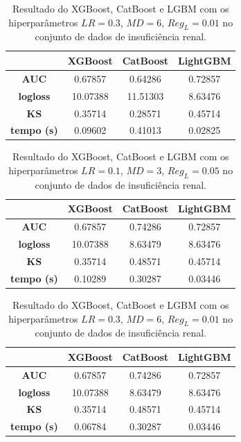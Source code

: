\begin{table}[H]
\label{res:ren:4}
\centering
\begin{tabular}{|c|c|c|c|}
\hline
	& \textbf{XGBoost} &\textbf{CatBoost} & \textbf{LightGBM} \\
\hline
\textbf{AUC}	& 0.67857&	0.64286	&0.72857\\
\hline
\textbf{logloss}	& 10.07388	&11.51303	&8.63476\\
\hline
\textbf{KS}	&0.35714	&0.28571	&0.45714\\
\hline
\textbf{tempo (s)}	&0.09602	&0.41013	&0.02825 \\
\hline
\end{tabular}
\caption{Resultado do XGBoost, CatBoost e LGBM com os hiperparâmetros $LR=0.3$, $MD=6$, $Reg_L=0.01$ no conjunto de dados de insuficiência renal.}
\end{table}

\begin{table}[H]
\label{res:ren:5}
\centering
\begin{tabular}{|c|c|c|c|}
\hline
	& \textbf{XGBoost} &\textbf{CatBoost} & \textbf{LightGBM} \\
\hline
\textbf{AUC}	& 0.67857	&0.74286&	0.72857 \\
\hline
\textbf{logloss}	& 10.07388&	8.63479&	8.63476 \\
\hline
\textbf{KS}	&0.35714	&0.48571	&0.45714\\
\hline
\textbf{tempo (s)}	&0.10289	&0.30287	&0.03446 \\
\hline
\end{tabular}
\caption{Resultado do XGBoost, CatBoost e LGBM com os hiperparâmetros $LR=0.1$, $MD=3$, $Reg_L=0.05$ no conjunto de dados de insuficiência renal.}
\end{table}

\begin{table}[H]
\label{res:ren:6}
\centering
\begin{tabular}{|c|c|c|c|}
\hline
	& \textbf{XGBoost} &\textbf{CatBoost} & \textbf{LightGBM} \\
\hline
\textbf{AUC}	& 0.67857&	0.74286&	0.72857 \\
\hline
\textbf{logloss}	& 10.07388	&8.63479&8.63476 \\
\hline
\textbf{KS}	& 0.35714	&0.48571	&0.45714 \\
\hline
\textbf{tempo (s)}	&0.06784&	0.30287	&0.03446 \\
\hline
\end{tabular}
\caption{Resultado do XGBoost, CatBoost e LGBM com os hiperparâmetros $LR=0.3$, $MD=6$, $Reg_L=0.01$ no conjunto de dados de insuficiência renal.}
\end{table}

